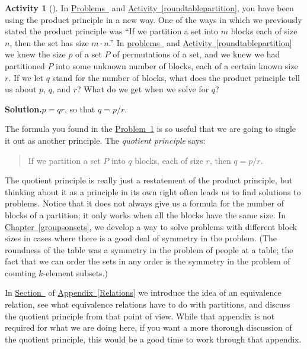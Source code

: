 \documentclass[10pt,]{book}
\theoremstyle{plain}
\theoremstyle{definition}
\newtheorem{activity}[project]{Activity}
\numberwithin{equation}{chapter}
\begin{document}
\begin{activity}[]\label{quotientprinciple}
In \hyperref[formulanchoosekfinal]{Problems~} and \hyperref[roundtablepartition]{Activity~\ref{roundtablepartition}}, you have been using the product principle in a new way. One of the ways in which we previously stated the product principle was ``If we partition a set into \(m\) blocks each of size \(n\), then the set has size \(m\cdot n\).'' In \hyperref[formulanchoosekfinal]{problems~} and \hyperref[roundtablepartition]{Activity~\ref{roundtablepartition}} we knew the size \(p\) of a set \(P\) of permutations of a set, and we knew we had partitioned \(P\) into some unknown number of blocks, each of a certain known size \(r\). If we let \(q\) stand for the number of blocks, what does the product principle tell us about \(p\), \(q\), and \(r\)? What do we get when we solve for \(q\)?%
\par\medskip\noindent%
\textbf{Solution.}\quad \(p=qr\), so that \(q=p/r\).%
\end{activity}
The formula you found in the \hyperref[quotientprinciple]{Problem~\ref{quotientprinciple}} is so useful that we are going to single it out as another principle. The \emph{quotient principle} says:%
\begin{quote}If we partition a set \(P\) into \(q\) blocks, each of size \(r\), then \(q=p/r.\)%
\end{quote}
The quotient principle is really just a restatement of the product principle, but thinking about it as a principle in its own right often leads us to find solutions to problems. Notice that it does not always give us a formula for the number of blocks of a partition; it only works when all the blocks have the same size. In \hyperref[groupsonsets]{Chapter~\ref{groupsonsets}}, we develop a way to solve problems with different block sizes in cases where there is a good deal of symmetry in the problem. (The roundness of the table was a symmetry in the problem of people at a table; the fact that we can order the sets in any order is the symmetry in the problem of counting \(k\)-element subsets.)%
\par
In \hyperref[equivalencerelations]{Section~} of \hyperref[Relations]{Appendix~\ref{Relations}} we introduce the idea of an equivalence relation, see what equivalence relations have to do with partitions, and discuss the quotient principle from that point of view. While that appendix is not required for what we are doing here, if you want a more thorough discussion of the quotient principle, this would be a good time to work through that appendix.%
\end{document}
